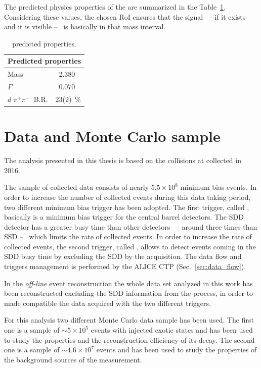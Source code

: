 The predicted physics properties of the \dst are summarized in the Table~\ref{tab:dst_prop}. 
Considering these values, the chosen RoI ensures that the signal \ -- if it exists and it is visible
-- \ is basically in that mass interval.
\begingroup
\renewcommand{\arraystretch}{1.5} %
\begin{table}
\centering
\captionsetup{justification=centering}
\begin{tabular}{lr}
\multicolumn{2}{c}{\textbf{Predicted properties}}      \\
\toprule
Mass				                   & 2.380 \ \gevcs   \\
$\Gamma$			        	       & 0.070 \ \gevcs   \\
$d\; \pi^{+} \pi^{-}\ $ B.R.	 & 23(2)\ \%		    \\
\midrule
\end{tabular}
\caption{\dst predicted properties.}
\label{tab:dst_prop}
\end{table}
\endgroup

%
%
\section{Data and Monte Carlo sample} \label{sec:4.2}

The analysis presented in this thesis is based on the \pPb collisions at \sctev 
collected in 2016. 

The sample of collected data consists of nearly $5.5\times10^{8}$ minimum bias events.
In order to increase the number of collected events during this data taking period, two
different minimum bias trigger has been adopted.
The first trigger, called , basically is a minimum bias trigger for the central barrel
detectors. The SDD detector has a greater busy time than other detectors \ -- around three times
than SSD -- \ which limits the rate of collected events. 
In order to increase the rate of collected events, the second trigger, called , allows
to detect events coming in the SDD busy time by excluding the SDD by the acquisition.
The data flow and triggers management is performed by the ALICE CTP (Sec.~\ref{sec:data_flow}).

In the \textit{off-line} event reconstruction the whole data set analyzed in this work has been
reconstructed excluding the SDD information from the process, in order to made compatible
the data acquired with the two different triggers.

For this analysis two different Monte Carlo data sample has been used.
The first one is a sample of $\sim 5 \times 10^{5}$ \pPb events with injected exotic states
and has been used to study the \dst properties and the reconstruction efficiency of its decay.
The second one is a sample of $\sim 4.6 \times 10^{7}$ \pPb events and has been used to study 
the properties of the background sources of the measurement.

